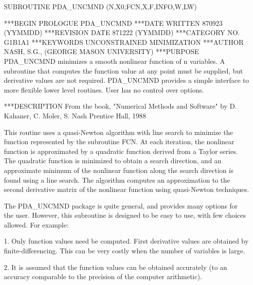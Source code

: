\documentclass[11pt,twoside,nolof]{starlink}
\begin{document}


\begin{terminalv}
      SUBROUTINE PDA_UNCMND (N,X0,FCN,X,F,INFO,W,LW)


***BEGIN PROLOGUE  PDA_UNCMND
***DATE WRITTEN   870923    (YYMMDD)
***REVISION DATE  871222    (YYMMDD)
***CATEGORY NO.  G1B1A1
***KEYWORDS  UNCONSTRAINED MINIMIZATION
***AUTHOR  NASH, S.G., (GEORGE MASON UNIVERSITY)
***PURPOSE  PDA_UNCMND minimizes a smooth nonlinear function of n variables.
            A subroutine that computes the function value at any point
            must be supplied, but derivative values are not required.
            PDA_UNCMND provides a simple interface to more flexible lower
            level routines.  User has no control over options.

***DESCRIPTION
     From the book, "Numerical Methods and Software" by
                D. Kahaner, C. Moler, S. Nash
                Prentice Hall, 1988

     This routine uses a quasi-Newton algorithm with line search
     to minimize the function represented by the subroutine FCN.
     At each iteration, the nonlinear function is approximated
     by a quadratic function derived from a Taylor series.
     The quadratic function is minimized to obtain a search direction,
     and an approximate minimum of the nonlinear function along
     the search direction is found using a line search.  The
     algorithm computes an approximation to the second derivative
     matrix of the nonlinear function using quasi-Newton techniques.

     The PDA_UNCMND package is quite general, and provides many options
     for the user.  However, this subroutine is designed to be
     easy to use, with few choices allowed.  For example:

     1.  Only function values need be computed.  First derivative
     values are obtained by finite-differencing.  This can be
     very costly when the number of variables is large.

     2.  It is assumed that the function values can be obtained
     accurately (to an accuracy comparable to the precision of
     the computer arithmetic).


\end{terminalv}
\end{document}
